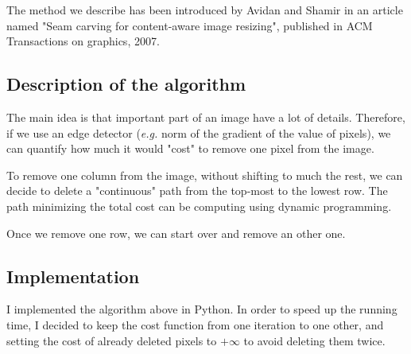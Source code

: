 \documentclass[a4paper]{article}
\begin{document}
  \medskip The method we describe has been introduced by Avidan and Shamir in an article named "Seam carving for content-aware image resizing", published in ACM Transactions on graphics, 2007.
  
  \subsection{Description of the algorithm}
  
  The main idea is that important part of an image have a lot of details. Therefore, if we use an edge detector (\textit{e.g.} norm of the gradient of the value of pixels), we can quantify how much it would "cost" to remove one pixel from the image.
  
  To remove one column from the image, without shifting to much the rest, we can decide to delete a "continuous" path from the top-most to the lowest row. The path minimizing the total cost can be computing using dynamic programming.
  
  Once we remove one row, we can start over and remove an other one.
  
  \subsection{Implementation}
  
  I implemented the algorithm above in Python. In order to speed up the running time, I decided to keep the cost function from one iteration to one other, and setting the cost of already deleted pixels to $+\infty$ to avoid deleting them twice.
  
\end{document}
